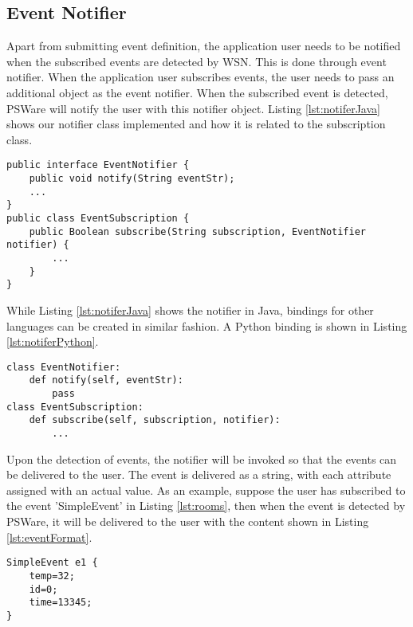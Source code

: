 \subsection{Event Notifier}
Apart from submitting event definition, the application user needs to be notified when the subscribed events are detected by WSN. This is done through event notifier. When the application user subscribes events, the user needs to pass an additional object as the event notifier. When the subscribed event is detected, PSWare will notify the user with this notifier object. Listing \ref{lst:notiferJava} shows our notifier class implemented and how it is related to the subscription class.

\begin{lstlisting}[caption=Event notifier in Java, label=lst:notiferJava]
public interface EventNotifier {
	public void notify(String eventStr);
	...
}
public class EventSubscription {
	public Boolean subscribe(String subscription, EventNotifier notifier) {
		...
	}
}
\end{lstlisting}

While Listing \ref{lst:notiferJava} shows the notifier in Java, bindings for other languages can be created in similar fashion. A Python binding is shown in Listing \ref{lst:notiferPython}.
\begin{lstlisting}[caption=Python binding of event notifier, label=lst:notiferPython]
class EventNotifier:
	def notify(self, eventStr):
		pass
class EventSubscription:
	def subscribe(self, subscription, notifier):
		...
\end{lstlisting}

Upon the detection of events, the notifier will be invoked so that the events can be delivered to the user. The event is delivered as a string, with each attribute assigned with an actual value. As an example, suppose the user has subscribed to the event 'SimpleEvent' in Listing \ref{lst:rooms}, then when the event is detected by PSWare, it will be delivered to the user with the content shown in Listing \ref{lst:eventFormat}.
\begin{lstlisting}[caption=Received event from notifier, label=lst:eventFormat]
SimpleEvent e1 {
	temp=32;
	id=0;
	time=13345;
}
\end{lstlisting}

